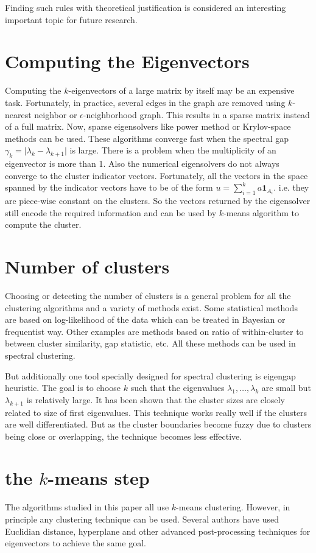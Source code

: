 \documentclass[10pt,a4paper, nocenter]{report}
\newcommand{\abs}[1]{\lvert {#1} \rvert}
\begin{document}
	Finding such rules with theoretical justification is considered an interesting important topic for future research. 
	
	\section{Computing the Eigenvectors}
	Computing the $k$-eigenvectors of a large matrix by itself may be an expensive task. Fortunately, in practice, several edges in the graph are removed using $k$-nearest neighbor or $\epsilon$-neighborhood graph. This results in a sparse matrix instead of a full matrix. Now, sparse eigensolvers like power method or Krylov-space methods can be used. These algorithms converge fast when the spectral gap $\gamma_{k} = \abs{\lambda_{k}-\lambda_{k+1}}$ is large. There is a problem when the multiplicity of an eigenvector is more than 1. Also the numerical eigensolvers do not always converge to the cluster indicator vectors. Fortunately, all the vectors in the space spanned by the indicator vectors have to be of the form $u=\sum_{i=1}^{k}a\mathbf{1}_{A_{i}}$. i.e. they are piece-wise constant on the clusters. So the vectors returned by the eigensolver still encode the required information and can be used by $k$-means algorithm to compute the cluster.
	
	\section{Number of clusters}
	Choosing or detecting the number of clusters is a general problem for all the clustering algorithms and a variety of methods exist. Some statistical methods are based on log-likelihood of the data which can be treated in Bayesian or frequentist way. Other examples are methods based on ratio of within-cluster to between cluster similarity, gap statistic, etc. All these methods can be used in spectral clustering. 
	
	But additionally one tool specially designed for spectral clustering is eigengap heuristic. The goal is to choose $k$ such that the eigenvalues $\lambda_{1},\dots,\lambda_{k}$ are small but $\lambda_{k+1}$ is relatively large. It has been shown that the cluster sizes are closely related to size of first eigenvalues. This technique works really well if the clusters are well differentiated. But as the cluster boundaries become fuzzy due to clusters being close or overlapping, the technique becomes less effective. 
	
	\section{the $k$-means step}
	The algorithms studied in this paper all use $k$-means clustering. However, in principle any clustering technique can be used. Several authors have used Euclidian distance, hyperplane and other advanced post-processing techniques for eigenvectors to achieve the same goal.
	
\end{document}
